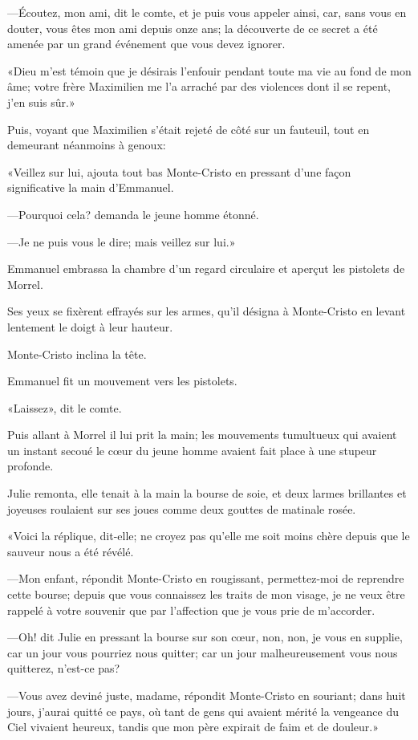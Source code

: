 —Écoutez, mon ami, dit le comte, et je puis vous appeler ainsi, car, sans vous en douter, vous êtes mon ami depuis onze ans; la découverte de ce secret a été amenée par un grand événement que vous devez ignorer. 

«Dieu m'est témoin que je désirais l'enfouir pendant toute ma vie au fond de mon âme; votre frère Maximilien me l'a arraché par des violences dont il se repent, j'en suis sûr.» 

Puis, voyant que Maximilien s'était rejeté de côté sur un fauteuil, tout en demeurant néanmoins à genoux: 

«Veillez sur lui, ajouta tout bas Monte-Cristo en pressant d'une façon significative la main d'Emmanuel. 

—Pourquoi cela? demanda le jeune homme étonné. 

—Je ne puis vous le dire; mais veillez sur lui.» 

Emmanuel embrassa la chambre d'un regard circulaire et aperçut les pistolets de Morrel. 

Ses yeux se fixèrent effrayés sur les armes, qu'il désigna à Monte-Cristo en levant lentement le doigt à leur hauteur. 

Monte-Cristo inclina la tête. 

Emmanuel fit un mouvement vers les pistolets. 

«Laissez», dit le comte. 

Puis allant à Morrel il lui prit la main; les mouvements tumultueux qui avaient un instant secoué le cœur du jeune homme avaient fait place à une stupeur profonde. 

Julie remonta, elle tenait à la main la bourse de soie, et deux larmes brillantes et joyeuses roulaient sur ses joues comme deux gouttes de matinale rosée. 

«Voici la réplique, dit-elle; ne croyez pas qu'elle me soit moins chère depuis que le sauveur nous a été révélé. 

—Mon enfant, répondit Monte-Cristo en rougissant, permettez-moi de reprendre cette bourse; depuis que vous connaissez les traits de mon visage, je ne veux être rappelé à votre souvenir que par l'affection que je vous prie de m'accorder. 

—Oh! dit Julie en pressant la bourse sur son cœur, non, non, je vous en supplie, car un jour vous pourriez nous quitter; car un jour malheureusement vous nous quitterez, n'est-ce pas? 

—Vous avez deviné juste, madame, répondit Monte-Cristo en souriant; dans huit jours, j'aurai quitté ce pays, où tant de gens qui avaient mérité la vengeance du Ciel vivaient heureux, tandis que mon père expirait de faim et de douleur.» 


